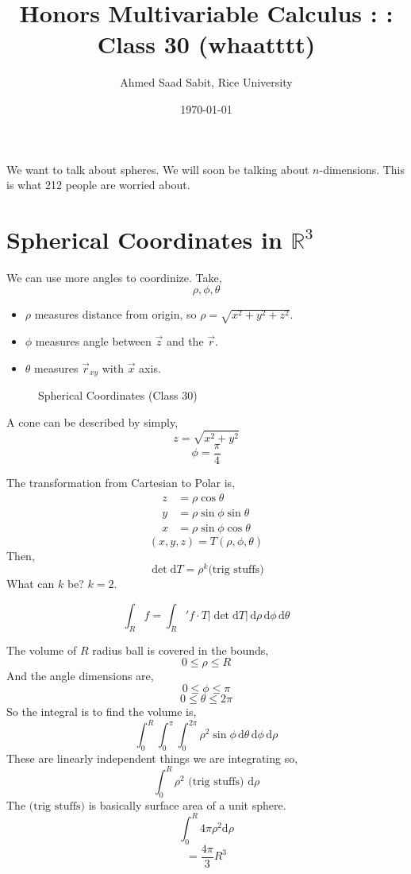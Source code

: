 \documentclass[letter]{article}
\title{Honors Multivariable Calculus : : Class 30 (whaatttt)}
\author{Ahmed Saad Sabit, Rice University}
\date{\today}
\begin{document}
\maketitle

We want to talk about spheres. We will soon be talking about $n$-dimensions. This is what 212 people are worried about. 

\section*{Spherical Coordinates in $\mathbb{R}^{3}$} 
We can use more angles to coordinize. Take, 
\[
\rho, \phi, \theta
\]
\begin{itemize}
	\item $\rho$ measures distance from origin, so $\rho = \sqrt{x^2 + y^2 + z^2} $. 
	\item $\phi$ measures angle between $\vec{z}$ and the $\vec{r}$. 
	\item $\theta$ measures $\vec{r} _{xy} $ with $\vec{x}$ axis. 
\end{itemize}
\begin{figure}[ht]
    \centering
    \caption{Spherical Coordinates (Class 30)}
    \label{fig:spherical-coordinates-(class-30)}
\end{figure}

A cone can be described by simply, 
\[
z = \sqrt{x^2+y^2} 
\]
\[
\phi = \frac{\pi}{4}
\]

The transformation from Cartesian to Polar is, 
\begin{align*}
	z &= \rho \cos \theta \\
	y &= \rho \sin \phi \sin \theta \\
	x &= \rho \sin \phi \cos \theta 
\end{align*}
\[
	(x,y,z) = T(\rho, \phi , \theta)
\] 
Then, 
\[
\det \mathrm{d} T = \rho^{k}  \text{(trig stuffs)}
\]
What can $ k$ be?  $k = 2$. 

\[
\int_R f = \int_R' f \cdot T | \det \mathrm{d} T| \, \mathrm{d} \rho \, \mathrm{d} \phi \, \mathrm{d} \theta 
\] 

The volume of $R$ radius ball is covered in the bounds,  
\[
0 \le \rho \le R
\]
And the angle dimensions are, 
\[
0 \le \phi \le \pi
\]
\[
0 \le \theta \le 2\pi
\]
So the integral is to find the volume is, 
\[
	\int_{0}^{R} \int_{0}^{ \pi } \int_{0}^{2 \pi } \rho^2 \sin \phi \, \mathrm{d} \theta \, \mathrm{d}  \phi \, \mathrm{d} \rho   
\] 
These are linearly independent things we are integrating so, 
\[
\int_{0}^{R}  \rho^2 \text{ (trig stuffs) } \mathrm{d} \rho 
\]
The $\text{(trig stuffs)}$ is basically surface area of a unit sphere.
\[
\int_{0}^{R}  4 \pi \rho^2 \mathrm{d} \rho 
\]
\[
= \frac{4 \pi }{3} R^3
\]
\end{document}
